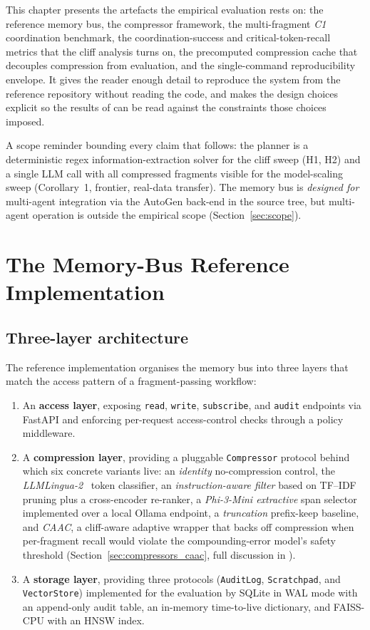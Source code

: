 This chapter presents the artefacts the empirical evaluation rests on:
the reference memory bus, the compressor framework, the multi-fragment
\emph{C1} coordination benchmark, the coordination-success and
critical-token-recall metrics that the cliff analysis turns on, the
precomputed compression cache that decouples compression from
evaluation, and the single-command reproducibility envelope. It gives
the reader enough detail to reproduce the system from the reference
repository without reading the code, and makes the design choices
explicit so the results of  can be read against
the constraints those choices imposed.

A scope reminder bounding every claim that follows: the planner is a
deterministic regex information-extraction solver for the cliff sweep
(H1, H2) and a single LLM call with all compressed fragments visible
for the model-scaling sweep (Corollary~1, frontier, real-data
transfer). The memory bus is \emph{designed for} multi-agent
integration via the AutoGen back-end in the source tree, but
multi-agent operation is outside the empirical scope
(Section~\ref{sec:scope}).

\section{The Memory-Bus Reference Implementation}
\label{sec:architecture}

\subsection{Three-layer architecture}

The reference implementation organises the memory bus into three
layers that match the access pattern of a fragment-passing workflow:

\begin{enumerate}
\setlength\itemsep{2pt}
\item An \textbf{access layer}, exposing \texttt{read},
\texttt{write}, \texttt{subscribe}, and \texttt{audit} endpoints via
FastAPI and enforcing per-request access-control checks through a
policy middleware.
\item A \textbf{compression layer}, providing a pluggable
\texttt{Compressor} protocol behind which six concrete variants live:
an \emph{identity} no-compression control, the
\emph{LLMLingua-2}~\cite{pan2024llmlingua2} token classifier, an
\emph{instruction-aware filter} based on TF--IDF pruning plus a
cross-encoder re-ranker, a \emph{Phi-3-Mini extractive} span selector
implemented over a local Ollama endpoint, a \emph{truncation}
prefix-keep baseline, and \emph{CAAC}, a cliff-aware adaptive
wrapper that backs off compression when per-fragment recall would
violate the compounding-error model's safety threshold
(Section~\ref{sec:compressors_caac}, full discussion in
).
\item A \textbf{storage layer}, providing three protocols
(\texttt{AuditLog}, \texttt{Scratchpad}, and \texttt{VectorStore})
implemented for the evaluation by SQLite in WAL mode with an
append-only audit table, an in-memory time-to-live dictionary, and
FAISS-CPU with an HNSW index.
\end{enumerate}

